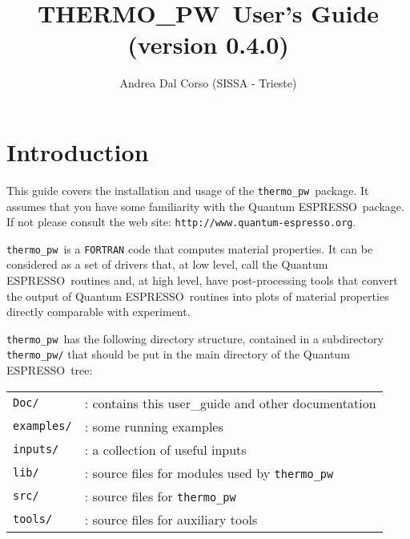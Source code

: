\documentclass[12pt,a4paper]{article}
\def\version{0.4.0}
\def\qe{{\sc Quantum ESPRESSO}}
\def\tpw{{\sc THERMO\_PW}}
\def\thermo{\texttt{thermo\_pw}}
\begin{document}
 
\author{Andrea Dal Corso (SISSA - Trieste)}
\date{}

\def\qeImage{../../Doc/quantum_espresso.pdf}
\def\democritosImage{../../Doc/democritos.pdf}
\def\SissaImage{./sissa.pdf}

\title{
  \vskip 1cm
  \Huge \tpw\ User's Guide \\
  \Large (version \version)
}

\maketitle

\tableofcontents

\section{Introduction}

This guide covers the installation and usage of the \thermo\ package. 
It assumes that you have some familiarity with the \qe\ package. 
If not please consult the web site: \texttt{http://www.quantum-espresso.org}.

\thermo\ is a \texttt{FORTRAN} code that computes material properties.
It can be considered as a set of drivers that,
at low level, call the \qe\ routines and, at high level, have post-processing 
tools that convert the output of \qe\ routines into plots of material 
properties directly comparable with experiment.

\thermo\ has the following directory structure, contained in a subdirectory 
\texttt{thermo\_pw/} that should be put in the main directory of the \qe\ tree:

\begin{tabular}{ll}
\texttt{Doc/}      & : contains this user\_guide and other documentation\\
\texttt{examples/} & : some running examples \\
\texttt{inputs/}   & : a collection of useful inputs \\
\texttt{lib/}      & : source files for modules used by \thermo\ \\
\texttt{src/}      & : source files for \thermo\ \\
\texttt{tools/}    & : source files for auxiliary tools \\
\end{tabular}\\
\end{document}
